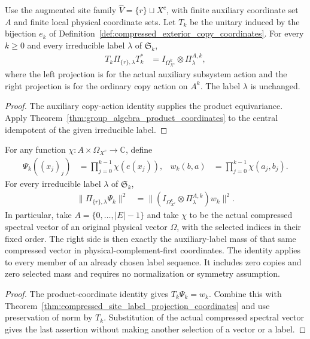 \begin{theorem}
\label{thm:compressed_site_label_projection_coordinates}
\leanok
{}
Use the augmented site family $\widehat V=\{r\}\sqcup X^c$, with
finite auxiliary coordinate set $A$ and finite local physical coordinate
sets. Let $T_k$ be the unitary induced by the bijection $e_k$ of
Definition~\ref{def:compressed_exterior_copy_coordinates}. For every
$k\ge0$ and every irreducible label $\lambda$ of $\mathfrak S_k$,
\begin{align}
 T_k\Pi_{\{r\},\lambda}T_k^*
 &=I_{\Omega_{X^c}^k}\otimes\Pi^{A,k}_\lambda,
\end{align}
where the left projection is for the actual auxiliary subsystem action
and the right projection is for the ordinary copy action on $A^k$.
The label $\lambda$ is unchanged.
\end{theorem}
\begin{proof}
\leanok
The auxiliary copy-action identity supplies the product equivariance.
Apply Theorem~\ref{thm:group_algebra_product_coordinates} to the central idempotent of the given
irreducible label.
\end{proof}

\begin{theorem}
\label{thm:compressed_site_label_mass_coordinates}
\leanok
{}
For any function $\chi:A\times\Omega_{X^c}\to\mathbb C$, define
\begin{align}
 \Psi_k((x_j)_j)&=\prod_{j=0}^{k-1}\chi(e(x_j)),
 &w_k(b,a)&=\prod_{j=0}^{k-1}\chi(a_j,b_j).
\end{align}
For every irreducible label $\lambda$ of $\mathfrak S_k$,
\begin{align}
 \|\Pi_{\{r\},\lambda}\Psi_k\|^2
 &=\|(I_{\Omega_{X^c}^k}\otimes\Pi^{A,k}_\lambda)w_k\|^2.
\end{align}
In particular, take $A=\{0,\ldots,|E|-1\}$ and take $\chi$ to be
the actual compressed spectral vector of an original physical vector
$\Omega$, with the selected indices in their fixed order. The right
side is then exactly the auxiliary-label mass of that same compressed
vector in physical-complement-first coordinates. The identity applies
to every member of an already chosen label sequence. It includes zero
copies and zero selected mass and requires no normalization or symmetry
assumption.
\end{theorem}
\begin{proof}
\leanok
The product-coordinate identity gives $T_k\Psi_k=w_k$. Combine this
with Theorem~\ref{thm:compressed_site_label_projection_coordinates} and use preservation of norm by
$T_k$. Substitution of the actual compressed spectral vector gives the
last assertion without making another selection of a vector or a label.
\end{proof}

